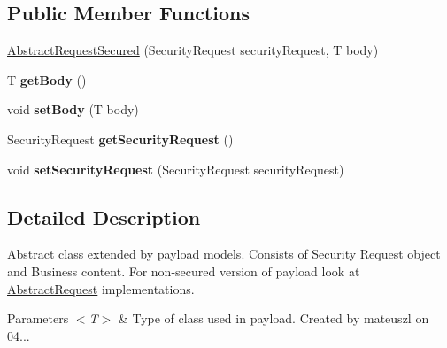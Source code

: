 \subsection*{Public Member Functions}
\begin{DoxyCompactItemize}
\item 
\hyperlink{classeu_1_1h2020_1_1symbiote_1_1core_1_1cci_1_1AbstractRequestSecured_a237493fdc92b6ed01f32ae8b2a7089ad}{Abstract\+Request\+Secured} (Security\+Request security\+Request, T body)
\item 
\mbox{\label{classeu_1_1h2020_1_1symbiote_1_1core_1_1cci_1_1AbstractRequestSecured_a5b3177f50cf558259f591a3d9ae5f423}} 
T {\bfseries get\+Body} ()
\item 
\mbox{\label{classeu_1_1h2020_1_1symbiote_1_1core_1_1cci_1_1AbstractRequestSecured_a9929d355c56b016eeb65d3bcaf30a58a}} 
void {\bfseries set\+Body} (T body)
\item 
\mbox{\label{classeu_1_1h2020_1_1symbiote_1_1core_1_1cci_1_1AbstractRequestSecured_ab98ec9536463cacff4a0734aace94f6d}} 
Security\+Request {\bfseries get\+Security\+Request} ()
\item 
\mbox{\label{classeu_1_1h2020_1_1symbiote_1_1core_1_1cci_1_1AbstractRequestSecured_a1ac4b033a16c88e3d2322b363743637a}} 
void {\bfseries set\+Security\+Request} (Security\+Request security\+Request)
\end{DoxyCompactItemize}


\subsection{Detailed Description}
Abstract class extended by payload models. Consists of Security Request object and Business content. For non-\/secured version of payload look at \hyperlink{classeu_1_1h2020_1_1symbiote_1_1core_1_1cci_1_1AbstractRequest}{Abstract\+Request} implementations. 


\begin{DoxyParams}{Parameters}
{\em $<$\+T$>$} & Type of class used in payload. Created by mateuszl on 04... \\
\hline
\end{DoxyParams}


